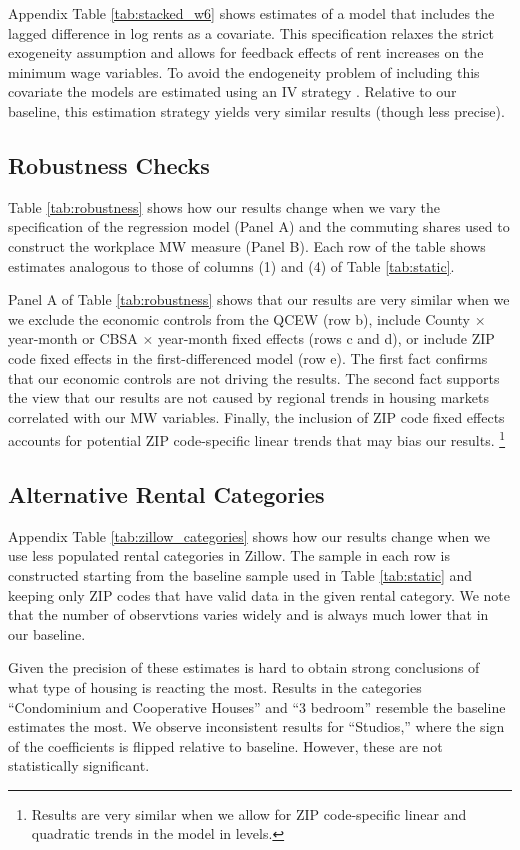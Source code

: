 Appendix Table \ref{tab:stacked_w6} shows estimates of a model that includes
the lagged difference in log rents as a covariate.
This specification relaxes the strict exogeneity assumption and allows for 
feedback effects of rent increases on the minimum wage variables.
To avoid the endogeneity problem of including this covariate the models are 
estimated using an IV strategy \parencite{ArellanoBond1991,ArellanoHonore2001}.
Relative to our baseline, this estimation strategy yields very similar results 
(though less precise).

\subsection{Robustness Checks}

Table \ref{tab:robustness} shows how our results change when we vary the
specification of the regression model (Panel A) and the commuting shares used 
to construct the workplace MW measure (Panel B).
Each row of the table shows estimates analogous to those of columns (1) and (4)
of Table \ref{tab:static}.

Panel A of Table \ref{tab:robustness} shows that our results are very similar 
when we we exclude the economic controls from the QCEW (row b), 
include County $\times$ year-month or CBSA $\times$ year-month fixed effects 
(rows c and d),
or include ZIP code fixed effects in the first-differenced model (row e).
The first fact confirms that our economic controls are not driving the results.
The second fact supports the view that our results are not caused by regional 
trends in housing markets correlated with our MW variables.
Finally, the inclusion of ZIP code fixed effects accounts for potential ZIP 
code-specific linear trends that may bias our results.%
\footnote{Results are very similar when we allow for ZIP code-specific
linear and quadratic trends in the model in levels.}

\subsection{Alternative Rental Categories}

Appendix Table \ref{tab:zillow_categories} shows how our results change when we 
use less populated rental categories in Zillow.
The sample in each row is constructed starting from the baseline sample used in 
Table \ref{tab:static} and keeping only ZIP codes that have valid data in the 
given rental category.
We note that the number of observtions varies widely and is always much lower
that in our baseline.

Given the precision of these estimates is hard to obtain strong conclusions of
what type of housing is reacting the most.
Results in the categories ``Condominium and Cooperative Houses'' and ``3 bedroom''
resemble the baseline estimates the most.
We observe inconsistent results for ``Studios,'' where the sign of the coefficients
is flipped relative to baseline.
However, these are not statistically significant.

